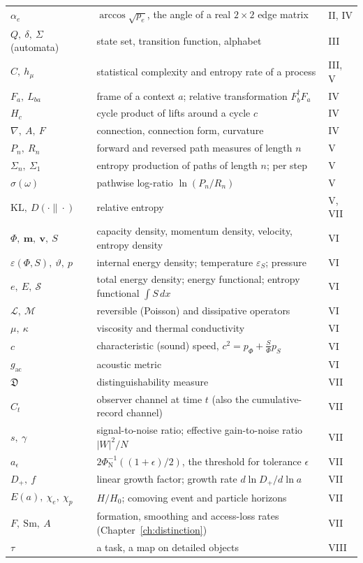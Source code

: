 \documentclass[11pt,oneside]{book}
\theoremstyle{definition}
\theoremstyle{remark}
\newcommand{\mathscr}[1]{\mathcal{#1}}
\begin{document}
\begin{longtable}{p{2.7cm}p{8.6cm}p{2.0cm}}
$\alpha_e$ & $\arccos\sqrt{p_e}$, the angle of a real $2\times2$ edge matrix & II, IV \\
$Q,\ \delta,\ \Sigma$ (automata) & state set, transition function, alphabet & III \\
$C,\ h_\mu$ & statistical complexity and entropy rate of a process & III, V \\
$F_a,\ L_{ba}$ & frame of a context $a$; relative transformation $F_b^\dagger F_a$ & IV \\
$H_c$ & cycle product of lifts around a cycle $c$ & IV \\
$\nabla,\ A,\ F$ & connection, connection form, curvature & IV \\
$P_n,\ R_n$ & forward and reversed path measures of length $n$ & V \\
$\Sigma_n,\ \Sigma_1$ & entropy production of paths of length $n$; per step & V \\
$\sigma(\omega)$ & pathwise log-ratio $\ln(P_n/R_n)$ & V \\
$\mathrm{KL},\ D(\cdot\|\cdot)$ & relative entropy & V, VII \\
$\Phi,\ \mathbf m,\ \mathbf v,\ S$ & capacity density, momentum density, velocity, entropy density & VI \\
$\varepsilon(\Phi,S),\ \vartheta,\ p$ & internal energy density; temperature $\varepsilon_S$; pressure & VI \\
$e,\ E,\ \mathscr S$ & total energy density; energy functional; entropy functional $\int S\,dx$ & VI \\
$\mathcal L,\ \mathcal M$ & reversible (Poisson) and dissipative operators & VI \\
$\mu,\ \kappa$ & viscosity and thermal conductivity & VI \\
$c$ & characteristic (sound) speed, $c^2=p_\Phi+\tfrac S\Phi p_S$ & VI \\
$g_{\mathrm{ac}}$ & acoustic metric & VI \\
$\mathfrak D$ & distinguishability measure & VII \\
$C_t$ & observer channel at time $t$ (also the cumulative-record channel) & VII \\
$s,\ \gamma$ & signal-to-noise ratio; effective gain-to-noise ratio $|W|^2/N$ & VII \\
$a_\epsilon$ & $2\Phi_{\mathrm N}^{-1}((1+\epsilon)/2)$, the threshold for tolerance $\epsilon$ & VII \\
$D_+,\ f$ & linear growth factor; growth rate $d\ln D_+/d\ln a$ & VII \\
$E(a),\ \chi_e,\ \chi_p$ & $H/H_0$; comoving event and particle horizons & VII \\
$F,\ \mathrm{Sm},\ A$ & formation, smoothing and access-loss rates (Chapter~\ref{ch:distinction}) & VII \\
$\tau$ & a task, a map on detailed objects & VIII \\
\hline
\end{longtable}
\end{document}
